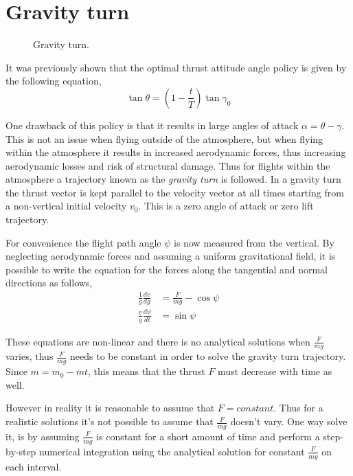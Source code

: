 \newpage
\section{Gravity turn}
\begin{figure} 		
	\centering
				
	\caption{Gravity turn\cite{thomson2012introduction}.}
	\label{fig:grav_turn}
\end{figure}

It was previously shown that the optimal thrust attitude angle policy is given by the following equation,
\begin{equation}
    \tan {\theta} = \left(1-\frac{t}{T}\right)\tan{\gamma_0}
\end{equation}

One drawback of this policy is that it results in large angles of attack $\alpha = \theta - \gamma$. This is not an issue when flying outside of the atmosphere, but when flying within the atmosphere it results in increased aerodynamic forces, thus increasing aerodynamic losses and risk of structural damage. Thus for flights within the atmosphere a trajectory known as the \emph{gravity turn} is followed. In a gravity turn the thrust vector is kept parallel to the velocity vector at all times starting from a non-vertical initial velocity $v_0$. This is a zero angle of attack or zero lift trajectory.

For convenience the flight path angle $\psi$ is now measured from the vertical. By neglecting aerodynamic forces and assuming a uniform gravitational field, it is possible to write the equation for the forces along the tangential and normal directions as follows,
\begin{align}
    \frac{1}{g} \frac{dv}{dg} &= \frac{F}{mg} - \cos{\psi} \label{eq:gturnzf_1}\\
    \frac{v}{g} \frac{d \psi}{dt} &= \sin{\psi} \label{eq:gturnzf_2}
\end{align}

These equations are non-linear and there is no analytical solutions when $\frac{F}{mg}$ varies, thus $\frac{F}{mg}$ needs to be constant in order to solve the gravity turn trajectory. Since $m = m_0 - \dot{m}t$, this means that the thrust $F$ must decrease with time as well.

However in reality it is reasonable to assume that $F=constant$. Thus for a realistic solutions it's not possible to assume that $\frac{F}{mg}$ doesn't vary. One way solve it, is by assuming $\frac{F}{mg}$ is constant for a short amount of time and perform a step-by-step numerical integration using the analytical solution for constant $\frac{F}{mg}$ on each interval.

